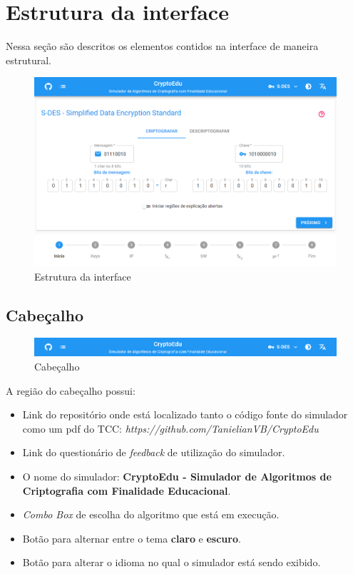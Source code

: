 \section{Estrutura da interface}
Nessa seção são descritos os elementos contidos na interface de maneira estrutural.

\begin{figure}[H]
    \centering
    \caption{Estrutura da interface}
    \includegraphics[width=1\linewidth]{UI/UIEstrutura.png}
\end{figure}

\subsection{Cabeçalho}

\begin{figure}[H]
    \centering
    \caption{Cabeçalho}
    \includegraphics[width=1\linewidth]{UI/UIHeader.png}
\end{figure}

A região do cabeçalho possui:
\begin{itemize}
    \item Link do repositório onde está localizado tanto o código fonte do simulador como um pdf do TCC: \textit{https://github.com/TanielianVB/CryptoEdu}
    \item Link do questionário de \textit{feedback} de utilização do simulador.
    \item O nome do simulador: \textbf{CryptoEdu - Simulador de Algoritmos de Criptografia com Finalidade Educacional}.
    \item \textit{Combo Box} de escolha do algoritmo que está em execução.
    \item Botão para alternar entre o tema \textbf{claro} e \textbf{escuro}.
    \item Botão para alterar o idioma no qual o simulador está sendo exibido.
\end{itemize}

